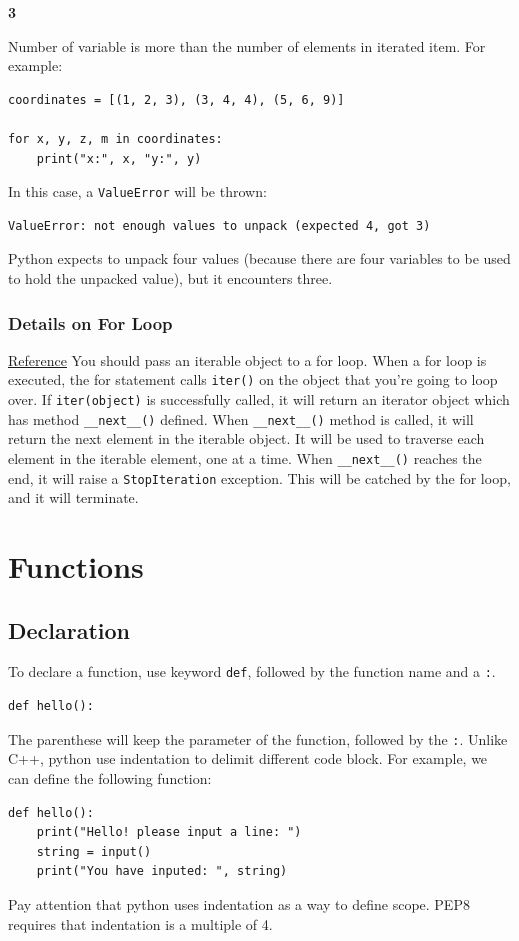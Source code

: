 \documentclass[12pt]{book}
\begin{document}
\textbf{3}

Number of variable is more than the number of elements in iterated item. For example:
\begin{verbatim}
coordinates = [(1, 2, 3), (3, 4, 4), (5, 6, 9)]

for x, y, z, m in coordinates:
    print("x:", x, "y:", y)
\end{verbatim}
In this case, a \texttt{ValueError} will be thrown:
\begin{verbatim}
ValueError: not enough values to unpack (expected 4, got 3)
\end{verbatim}
Python expects to unpack four values (because there are four variables to be used to hold the unpacked value), but it encounters three.
\subsection{Details on For Loop  \label{org900c2e7}}
\label{sec:org4a69466}
\href{https://www.geeksforgeeks.org/python-difference-iterable-iterator/}{Reference}
You should pass an iterable object to a for loop. When a for loop is executed, the for statement calls \texttt{iter()} on the object that you're going to loop over. If \texttt{iter(object)} is successfully called, it will return an iterator object which has method \texttt{\_\_next\_\_()} defined. When \texttt{\_\_next\_\_()} method is called, it will return the next element in the iterable object. It will be used to traverse each element in the iterable element, one at a time. When \texttt{\_\_next\_\_()} reaches the end, it will raise a \texttt{StopIteration} exception. This will be catched by the for loop, and it will terminate.

\chapter{Functions}
\label{sec:org5ab2ad0}
\section{Declaration}
\label{sec:orgc11bfda}
To declare a function, use keyword \texttt{def}, followed by the function name and a \texttt{:}.
\begin{verbatim}
def hello():
\end{verbatim}
The parenthese will keep the parameter of the function, followed by the \texttt{:}. Unlike C++, python use indentation to delimit different code block. For example, we can define the following function:
\begin{verbatim}
def hello():
    print("Hello! please input a line: ")
    string = input()
    print("You have inputed: ", string)
\end{verbatim}
Pay attention that python uses indentation as a way to define scope. PEP8 requires that indentation is a multiple of 4.
\end{document}
